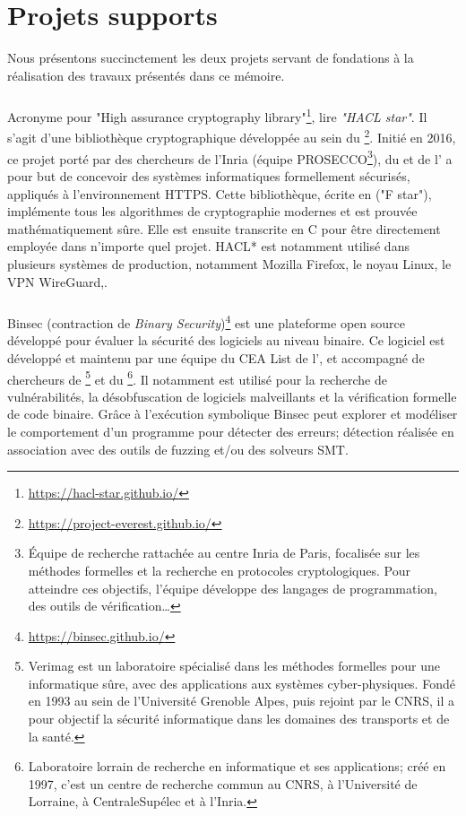 \chapter*{Projets supports}
\label{chap:supports}

Nous présentons succinctement les deux projets servant de fondations à la réalisation des travaux présentés dans ce mémoire.

\subsection*{}
Acronyme pour "High assurance cryptography library"\footnote{\url{https://hacl-star.github.io/}}, lire \textit{"HACL star"}. Il s'agit d'une bibliothèque cryptographique développée au sein du \textbf{}\footnote{\url{https://project-everest.github.io/}}. Initié en 2016, ce projet porté par des chercheurs de l'Inria (équipe PROSECCO\footnote{Équipe de recherche rattachée au centre Inria de Paris, focalisée sur les méthodes formelles et la recherche en protocoles cryptologiques. Pour atteindre ces objectifs, l'équipe développe des langages de programmation, des outils de vérification\dots}), du  et de l' a pour but de concevoir des systèmes informatiques formellement sécurisés, appliqués à l'environnement HTTPS. Cette bibliothèque, écrite en  ("F star"), implémente tous les algorithmes de cryptographie modernes et est prouvée mathématiquement sûre. Elle est ensuite transcrite en C pour être directement employée dans n'importe quel projet. HACL* est notamment utilisé dans plusieurs systèmes de production, notamment Mozilla Firefox, le noyau Linux, le VPN WireGuard,\etc.


\subsection*{}
Binsec (contraction de \textit{Binary Security})\footnote{\url{https://binsec.github.io/}} est une plateforme open source développé pour évaluer la sécurité des logiciels au niveau binaire. Ce logiciel est développé et maintenu par une équipe du CEA List de l', et accompagné de chercheurs de \footnote{Verimag est un laboratoire spécialisé dans les méthodes formelles pour une informatique sûre, avec des applications aux systèmes cyber-physiques. Fondé en 1993 au sein de l'Université Grenoble Alpes, puis rejoint par le CNRS, il a pour objectif la sécurité informatique dans les domaines des transports et de la santé.} et du \footnote{Laboratoire lorrain de recherche en informatique et ses applications; créé en 1997, c'est un centre de recherche commun au CNRS, à l'Université de Lorraine, à CentraleSupélec et à l'Inria.}. Il notamment est utilisé pour la recherche de vulnérabilités, la désobfuscation de logiciels malveillants et la vérification formelle de code binaire. Grâce à l'exécution symbolique Binsec peut explorer et modéliser le comportement d'un programme pour détecter des erreurs; détection réalisée en association avec des outils de fuzzing et/ou des solveurs SMT.
